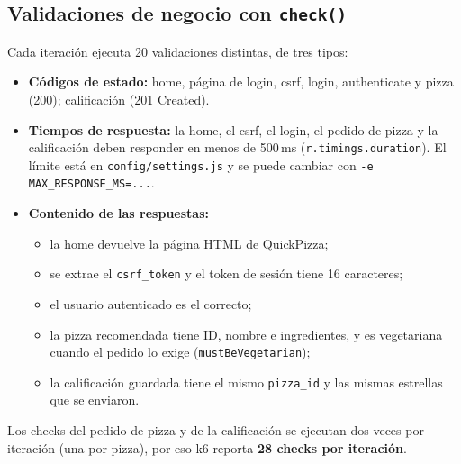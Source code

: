 \documentclass[11pt]{article}
\begin{document}
\subsection{Validaciones de negocio con \texorpdfstring{\texttt{check()}}{check()}}

Cada iteración ejecuta 20 validaciones distintas, de tres tipos:

\begin{itemize}
  \item \textbf{Códigos de estado:} home, página de login, csrf, login, authenticate
        y pizza (200); calificación (201 Created).
  \item \textbf{Tiempos de respuesta:} la home, el csrf, el login, el pedido de pizza
        y la calificación deben responder en menos de 500\,ms
        (\texttt{r.timings.duration}). El límite está en \texttt{config/settings.js}
        y se puede cambiar con \texttt{-e MAX\_RESPONSE\_MS=...}.
  \item \textbf{Contenido de las respuestas:}
        \begin{itemize}
          \item la home devuelve la página HTML de QuickPizza;
          \item se extrae el \texttt{csrf\_token} y el token de sesión tiene 16 caracteres;
          \item el usuario autenticado es el correcto;
          \item la pizza recomendada tiene ID, nombre e ingredientes, y es vegetariana
                cuando el pedido lo exige (\texttt{mustBeVegetarian});
          \item la calificación guardada tiene el mismo \texttt{pizza\_id} y las mismas
                estrellas que se enviaron.
        \end{itemize}
\end{itemize}

Los checks del pedido de pizza y de la calificación se ejecutan dos veces por
iteración (una por pizza), por eso k6 reporta \textbf{28 checks por iteración}.

\end{document}
